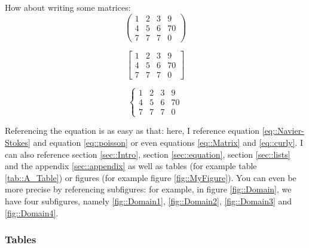 \documentclass[12pt]{article}
\begin{document}
How about writing some matrices:
\begin{equation}
\left(
\begin{array}{cccc}
 1 & 2  & 3 & 9 \\
4  & 5  & 6  & 70\\
7  & 7  & 7 & 0 
\end{array}
\right) %
\label{eq::Matrix}
\end{equation}

\begin{equation*} %
\left [
\begin{array}{cccc}
 1 & 2  & 3 & 9 \\
4  & 5  & 6  & 70\\
7  & 7  & 7 & 0 
\end{array}
\right]
\end{equation*}

\begin{equation}
\left\{ %
\begin{array}{cccc}
 1 & 2  & 3 & 9 \\
4  & 5  & 6  & 70\\
7  & 7  & 7 & 0 
\end{array}
\right. %
\label{eq::curly}
\end{equation}


Referencing the equation is as easy as that: here, I reference equation \eqref{eq::Navier-Stokes} and equation \eqref{eq::poisson} or even equations \eqref{eq::Matrix} and \eqref{eq::curly}. I can also reference section \ref{sec::Intro}, section \ref{sec::equation}, section \ref{sec::lists} and the appendix \ref{sec::appendix} as well as tables (for example table \ref{tab::A_Table}) or figures (for example figure \ref{fig::MyFigure}). You can even be more precise by referencing subfigures: for example, in figure \ref{fig::Domain}, we have four subfigures, namely \ref{fig::Domain1}, \ref{fig::Domain2}, \ref{fig::Domain3} and  \ref{fig::Domain4}.


\subsubsection{Tables}\label{sec::table}
\end{document}
